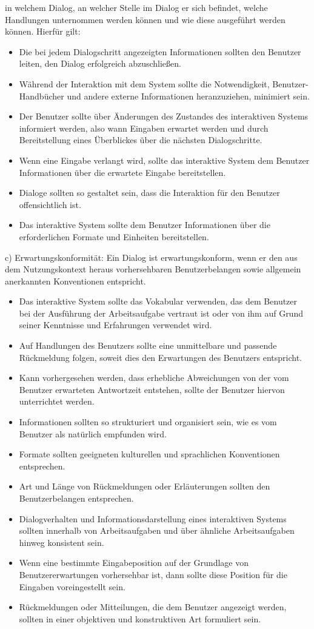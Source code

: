 in welchem Dialog, an welcher Stelle im Dialog er sich befindet, welche Handlungen unternommen werden
können und wie diese ausgeführt werden können. Hierfür gilt:
\begin{itemize}
	\item Die bei jedem Dialogschritt angezeigten Informationen sollten den Benutzer leiten, den Dialog
	erfolgreich abzuschließen.
	\item Während der Interaktion mit dem System sollte die Notwendigkeit, Benutzer-Handbücher und andere
	externe Informationen heranzuziehen, minimiert sein.
	\item Der Benutzer sollte über Änderungen des Zustandes des interaktiven Systems informiert werden, also wann Eingaben erwartet werden und durch Bereitstellung eines Überblickes über die nächsten Dialogschritte.
	\item Wenn eine Eingabe verlangt wird, sollte das interaktive System dem Benutzer Informationen über die
	erwartete Eingabe bereitstellen.
	\item Dialoge sollten so gestaltet sein, dass die Interaktion für den Benutzer offensichtlich ist.
	\item Das interaktive System sollte dem Benutzer Informationen über die erforderlichen Formate und
	Einheiten bereitstellen.
\end{itemize}
c) Erwartungskonformität:\newline
Ein Dialog ist erwartungskonform, wenn er den aus dem Nutzungskontext heraus vorhersehbaren Benutzerbelangen
sowie allgemein anerkannten Konventionen entspricht.
\begin{itemize}
	\item Das interaktive System sollte das Vokabular verwenden, das dem Benutzer bei der Ausführung der
	Arbeitsaufgabe vertraut ist oder von ihm auf Grund seiner Kenntnisse und Erfahrungen verwendet wird.
	\item Auf Handlungen des Benutzers sollte eine unmittelbare und passende Rückmeldung folgen, soweit
	dies den Erwartungen des Benutzers entspricht.
	\item Kann vorhergesehen werden, dass erhebliche Abweichungen von der vom Benutzer erwarteten
	Antwortzeit entstehen, sollte der Benutzer hiervon unterrichtet werden.
	\item Informationen sollten so strukturiert und organisiert sein, wie es vom Benutzer als natürlich
	empfunden wird.
	\item Formate sollten geeigneten kulturellen und sprachlichen Konventionen entsprechen.
	\item Art und Länge von Rückmeldungen oder Erläuterungen sollten den Benutzerbelangen entsprechen.
	\item Dialogverhalten und Informationsdarstellung eines interaktiven Systems sollten innerhalb von
	Arbeitsaufgaben und über ähnliche Arbeitsaufgaben hinweg konsistent sein.
	\item Wenn eine bestimmte Eingabeposition auf der Grundlage von Benutzererwartungen vorhersehbar ist,
	dann sollte diese Position für die Eingaben voreingestellt sein.
	\item Rückmeldungen oder Mitteilungen, die dem Benutzer angezeigt werden, sollten in einer objektiven
	und konstruktiven Art formuliert sein.
\end{itemize}
